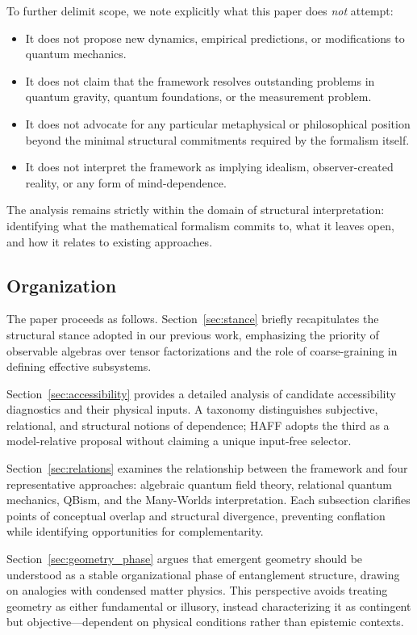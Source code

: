 \documentclass[12pt,a4paper]{article}
\begin{document}
To further delimit scope, we note explicitly what this paper does \emph{not} attempt:

\begin{itemize}
\item It does not propose new dynamics, empirical predictions, or modifications to quantum mechanics.
\item It does not claim that the framework resolves outstanding problems in quantum gravity, quantum foundations, or the measurement problem.
\item It does not advocate for any particular metaphysical or philosophical position beyond the minimal structural commitments required by the formalism itself.
\item It does not interpret the framework as implying idealism, observer-created reality, or any form of mind-dependence.
\end{itemize}

The analysis remains strictly within the domain of structural interpretation: identifying what the mathematical formalism commits to, what it leaves open, and how it relates to existing approaches.

\subsection{Organization}

The paper proceeds as follows. Section~\ref{sec:stance} briefly recapitulates the structural stance adopted in our previous work, emphasizing the priority of observable algebras over tensor factorizations and the role of coarse-graining in defining effective subsystems. 

Section~\ref{sec:accessibility} provides a detailed analysis of candidate accessibility diagnostics and their physical inputs. A taxonomy distinguishes subjective, relational, and structural notions of dependence; HAFF adopts the third as a model-relative proposal without claiming a unique input-free selector.

Section~\ref{sec:relations} examines the relationship between the framework and four representative approaches: algebraic quantum field theory, relational quantum mechanics, QBism, and the Many-Worlds interpretation. Each subsection clarifies points of conceptual overlap and structural divergence, preventing conflation while identifying opportunities for complementarity.

Section~\ref{sec:geometry_phase} argues that emergent geometry should be understood as a stable organizational phase of entanglement structure, drawing on analogies with condensed matter physics. This perspective avoids treating geometry as either fundamental or illusory, instead characterizing it as contingent but objective—dependent on physical conditions rather than epistemic contexts.
\end{document}
